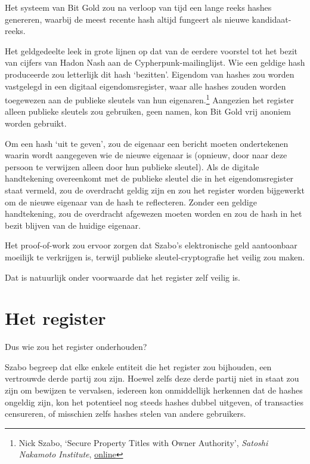 \documentclass[
  a5paper,
  smalldemyvopaper,11pt,twoside,onecolumn,openright,extrafontsizes]{memoir}
\begin{document}
Het systeem van Bit Gold zou na verloop van tijd een lange reeks hashes
genereren, waarbij de meest recente hash altijd fungeert als nieuwe
kandidaat-reeks.

Het geldgedeelte leek in grote lijnen op dat van de eerdere voorstel tot
het bezit van cijfers van Hadon Nash aan de Cypherpunk-mailinglijst. Wie
een geldige hash produceerde zou letterlijk dit hash `bezitten'.
Eigendom van hashes zou worden vastgelegd in een digitaal
eigendomsregister, waar alle hashes zouden worden toegewezen aan de
publieke sleutels van hun eigenaren.\footnote{Nick Szabo, `Secure
  Property Titles with Owner Authority', \emph{Satoshi Nakamoto
  Institute},
  \href{https://nakamotoinstitute.org/library/secure-property-titles/}{online}}
Aangezien het register alleen publieke sleutels zou gebruiken, geen
namen, kon Bit Gold vrij anoniem worden gebruikt.

Om een hash `uit te geven', zou de eigenaar een bericht moeten
ondertekenen waarin wordt aangegeven wie de nieuwe eigenaar is (opnieuw,
door naar deze persoon te verwijzen alleen door hun publieke sleutel).
Als de digitale handtekening overeenkomt met de publieke sleutel die in
het eigendomsregister staat vermeld, zou de overdracht geldig zijn en
zou het register worden bijgewerkt om de nieuwe eigenaar van de hash te
reflecteren. Zonder een geldige handtekening, zou de overdracht
afgewezen moeten worden en zou de hash in het bezit blijven van de
huidige eigenaar.

Het proof-of-work zou ervoor zorgen dat Szabo's elektronische geld
aantoonbaar moeilijk te verkrijgen is, terwijl publieke
sleutel-cryptografie het veilig zou maken.

Dat is natuurlijk onder voorwaarde dat het register zelf veilig is.

\section{Het register}\label{het-register}

Dus wie zou het register onderhouden?

Szabo begreep dat elke enkele entiteit die het register zou bijhouden,
een vertrouwde derde partij zou zijn. Hoewel zelfs deze derde partij
niet in staat zou zijn om bewijzen te vervalsen, iedereen kon
onmiddellijk herkennen dat de hashes ongeldig zijn, kon het potentieel
nog steeds hashes dubbel uitgeven, of transacties censureren, of
misschien zelfs hashes stelen van andere gebruikers.
\end{document}
